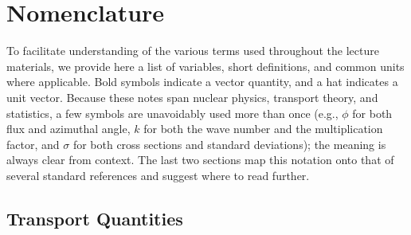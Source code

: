 \chapter{Nomenclature}
\label{app:nomenclature}

To facilitate understanding of the various terms used throughout the lecture materials, we provide here a list of variables, short definitions, and common units where applicable.  Bold symbols indicate a vector quantity, and a hat indicates a unit vector.  Because these notes span nuclear physics, transport theory, and statistics, a few symbols are unavoidably used more than once (e.g., $\phi$ for both flux and azimuthal angle, $k$ for both the wave number and the multiplication factor, and $\sigma$ for both cross sections and standard deviations); the meaning is always clear from context.  The last two sections map this notation onto that of several standard references and suggest where to read further.

\section*{Transport Quantities}

